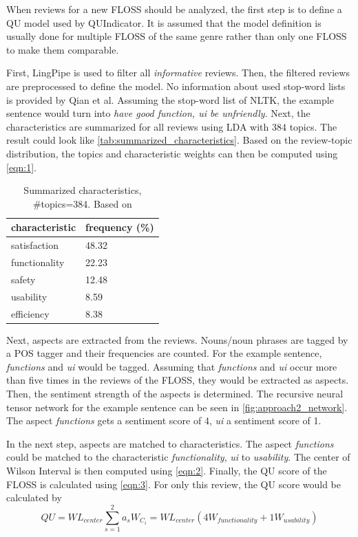 When reviews for a new FLOSS should be analyzed, the first step is to define a QU model used by QUIndicator. It is assumed that the model definition is usually done for multiple FLOSS of the same genre rather than only one FLOSS to make them comparable.

First, LingPipe is used to filter all \textit{informative} reviews. Then, the filtered reviews are preprocessed to define the model. No information about used stop-word lists is provided by Qian et al. Assuming the stop-word list of NLTK, the example sentence would turn into \textit{have good function, ui be unfriendly}. Next, the characteristics are summarized for all reviews using LDA with 384 topics. The result could look like \autoref{tab:summarized_characteristics}. Based on the review-topic distribution, the topics and characteristic weights can then be computed using \autoref{eqn:1}.

\begin{table} [t]
    \centering
    \begin{small}
    \caption{Summarized characteristics, \#topics=384. Based on \cite[Table I]{Qian2016}}
    \label{tab:summarized_characteristics}
    \setlength{\tabcolsep}{1em}
    \begin{tabular}{l|l}
    \textbf{characteristic} & \textbf{frequency (\%)} \\
    \hline
    satisfaction & 48.32\\
    functionality & 22.23\\
    safety & 12.48\\
    usability & 8.59\\
    efficiency & 8.38\\
    \end{tabular}
    \end{small}
\end{table}

Next, aspects are extracted from the reviews. Nouns/noun phrases are tagged by a POS tagger and their frequencies are counted. For the example sentence, \textit{functions} and \textit{ui} would be tagged. Assuming that \textit{functions} and \textit{ui} occur more than five times in the reviews of the FLOSS, they would be extracted as aspects. Then, the sentiment strength of the aspects is determined. The recursive neural tensor network for the example sentence can be seen in \autoref{fig:approach2_network}. The aspect \textit{functions} gets a sentiment score of 4, \textit{ui} a sentiment score of 1.

In the next step, aspects are matched to characteristics. The aspect \textit{functions} could be matched to the characteristic \textit{functionality}, \textit{ui} to \textit{usability}. The center of Wilson Interval is then computed using \autoref{eqn:2}. Finally, the QU score of the FLOSS is calculated using \autoref{eqn:3}. For only this review, the QU score would be calculated by
\begin{equation}
    QU = WL_{center} \sum_{s=1}^{2} a_{s} W_{C_i} = WL_{center} (4 W_{functionality} + 1 W_{usability})
\end{equation}


